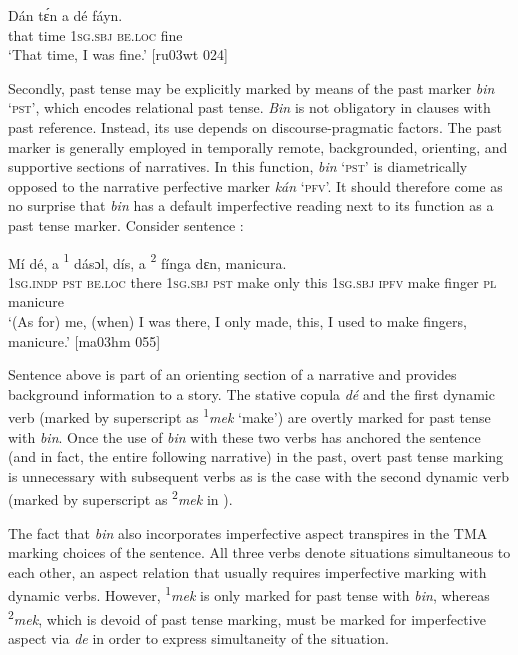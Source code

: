 \ea%
    \label{ex:key:380}
    \gll Dán    tɛ́n    a    dé    fáyn.\\
that    time    \textsc{1sg.sbj}  \textsc{be.loc}  fine\\

\glt ‘That time, I was fine.’ [ru03wt 024]
\z

Secondly, past tense may be explicitly marked by means of the past marker \textit{bin} ‘\textsc{pst’}, which encodes relational past tense. \textit{Bin} is not obligatory in clauses with past reference. Instead, its use depends on discourse-pragmatic factors. The past marker is generally employed in temporally remote, backgrounded, orienting, and supportive sections of narratives. In this function, \textit{bin} ‘\textsc{pst}’ is diametrically opposed to the narrative perfective marker \textit{kán} ‘\textsc{pfv}’. It should therefore come as no surprise that \textit{bin} has a default imperfective reading next to its function as a past tense marker. Consider sentence : 

\ea%
    \label{ex:key:381}
    \gll Mí         dé,    a     {\textup{\textsuperscript{1}}}  dásɔl,  dís,
a     {\textup{\textsuperscript{2}}}  fínga  dɛn,    manicura.\\
\textsc{1sg.indp}  \textsc{pst}  \textsc{be.loc}  there  \textsc{1sg.sbj}  \textsc{pst}  make  only    this
\textsc{1sg.sbj}  \textsc{ipfv}  make  finger  \textsc{pl}    manicure\\

\glt ‘(As for) me, (when) I was there, I only made, this, 
I used to make fingers, manicure.’ [ma03hm 055]
\z

Sentence  above is part of an orienting section of a narrative and provides background information to a story. The stative copula \textit{dé} and the first dynamic verb (marked by superscript as \textsuperscript{1}\textit{mek} ‘make’) are overtly marked for past tense with \textit{bin}. Once the use of \textit{bin} with these two verbs has anchored the sentence (and in fact, the entire following narrative) in the past, overt past tense marking is unnecessary with subsequent verbs as is the case with the second dynamic verb (marked by superscript as \textsuperscript{2}\textit{mek} in ). 


The fact that \textit{bin} also incorporates imperfective aspect transpires in the TMA marking choices of the sentence. All three verbs denote situations simultaneous to each other, an aspect relation that usually requires imperfective marking with dynamic verbs. However, \textsuperscript{1}\textit{mek} is only marked for past tense with \textit{bin}, whereas \textsuperscript{2}\textit{mek}, which is devoid of past tense marking, must be marked for imperfective aspect via \textit{de} in order to express simultaneity of the situation.




